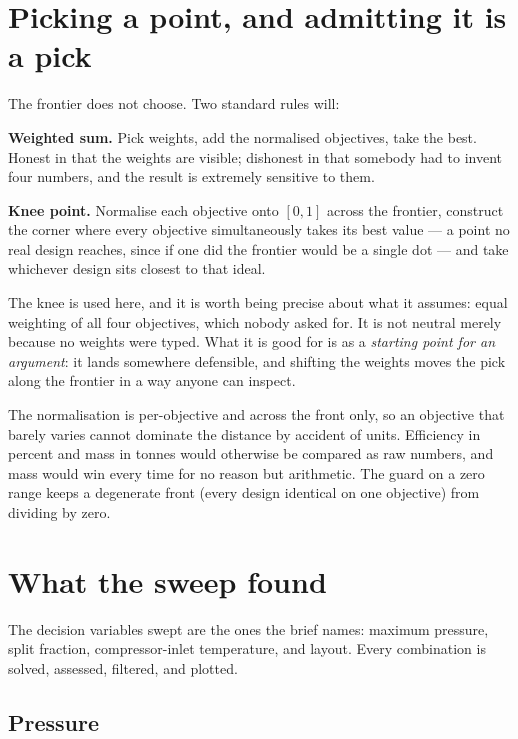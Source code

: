 \documentclass[11pt,a4paper]{report}
\begin{document}
\section{Picking a point, and admitting it is a pick}

The frontier does not choose. Two standard rules will:

\textbf{Weighted sum.} Pick weights, add the normalised objectives, take the
best. Honest in that the weights are visible; dishonest in that somebody had
to invent four numbers, and the result is extremely sensitive to them.

\textbf{Knee point.} Normalise each objective onto $[0,1]$ across the
frontier, construct the corner where every objective simultaneously takes
its best value --- a point no real design reaches, since if one did the
frontier would be a single dot --- and take whichever design sits closest to
that ideal.

The knee is used here, and it is worth being precise about what it assumes:
equal weighting of all four objectives, which nobody asked for. It is not
neutral merely because no weights were typed. What it is good for is as a
\emph{starting point for an argument}: it lands somewhere defensible, and
shifting the weights moves the pick along the frontier in a way anyone can
inspect.

\begin{choicebox}

The normalisation is per-objective and across the front only, so an
objective that barely varies cannot dominate the distance by accident of
units. Efficiency in percent and mass in tonnes would otherwise be compared
as raw numbers, and mass would win every time for no reason but arithmetic.
The guard on a zero range keeps a degenerate front (every design identical
on one objective) from dividing by zero.
\end{choicebox}

\section{What the sweep found}

The decision variables swept are the ones the brief names: maximum pressure,
split fraction, compressor-inlet temperature, and layout. Every combination
is solved, assessed, filtered, and plotted.

\subsection{Pressure}
\end{document}
